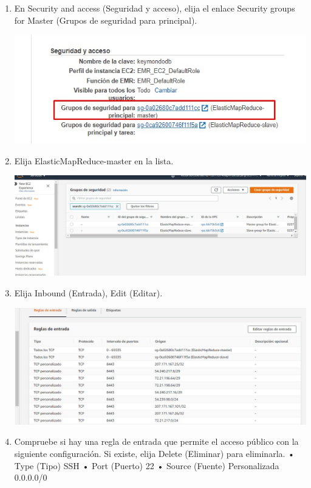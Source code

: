 \documentclass[12pt,letterpaper]{article}
\begin{document}
\begin{enumerate}
\begin{enumerate}
	
		\item	En Security and access (Seguridad y acceso), elija el enlace Security groups for Master (Grupos de
			seguridad para principal).
			\begin{center}
				\includegraphics[width=14cm]{./img/3.4.jpg} 
			\end{center}
		\item Elija ElasticMapReduce-master en la lista. 
		\begin{center}
			\includegraphics[width=14cm]{./img/3.5.jpg} 
		\end{center}
		\item Elija Inbound (Entrada), Edit (Editar). 
		\begin{center}
			\includegraphics[width=14cm]{./img/3.6.jpg} 
		\end{center}
		\item Compruebe si hay una regla de entrada que permite el acceso público con la siguiente configuración. Si
		existe, elija Delete (Eliminar) para eliminarla.
		• Type (Tipo) SSH
		• Port (Puerto) 22
		• Source (Fuente) Personalizada 0.0.0.0/0 

\end{enumerate}
\end{enumerate}
\end{document}
